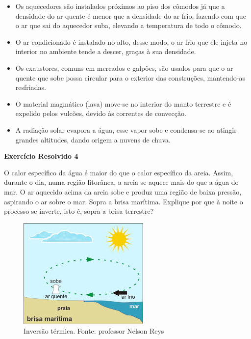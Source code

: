 \documentclass[12pt,twoside]{article}
\begin{document}
\begin{itemize}

\item Os aquecedores são instalados próximos ao piso dos cômodos já que a densidade do ar quente é menor que a densidade do ar frio, fazendo com que o ar que sai do aquecedor suba, elevando a temperatura de todo o cômodo.

\item O ar condicionado é instalado no alto, desse modo, o ar frio que ele injeta no interior no ambiente tende a descer, graças à sua densidade.

\item Os exaustores, comuns em mercados e galpões, são usados para que o ar quente que sobe possa circular para o exterior das construções, mantendo-as resfriadas.

\item O material magmático (lava) move-se no interior do manto terrestre e é expelido pelos vulcões, devido às correntes de convecção.

\item A radiação solar evapora a água, esse vapor sobe e condensa-se ao atingir grandes altitudes, dando origem a nuvens de chuva.

\end{itemize}


\textbf{Exercício Resolvido 4}


O calor específico da água é maior do que o calor específico da areia. Assim, durante o dia, numa região litorânea, a areia se aquece mais do que a água do mar. O ar aquecido acima da areia sobe e produz uma região de baixa pressão, aspirando o ar sobre o mar. Sopra a brisa marítima. Explique por que à noite o processo se inverte, isto é, sopra a brisa terrestre?


\begin{figure}[h]{}
\centering\includegraphics[width=2.5truein]{praia2.jpg}
\caption{Inversão térmica. Fonte: professor Nelson Reys}

\end{figure}
\end{document}
